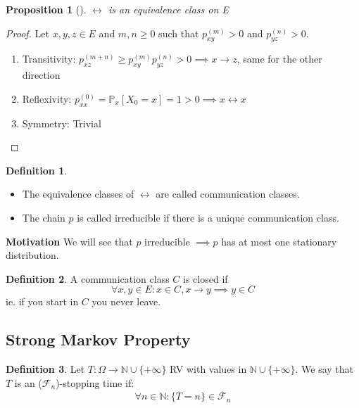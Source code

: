 \documentclass[12pt]{book}
\newtheorem{prop}[theorem]{Proposition}
\theoremstyle{definition}
\newtheorem{defn}{Definition}[section]
\theoremstyle{remark}
\begin{document}
\begin{prop}[]
	$\leftrightarrow$ is an equivalence class on E
\end{prop}
\begin{proof}
	Let $x,y,z \in E$ and $m,n \geq 0$ such that $p_{xy}^{(m)}>0$ and $p_{yz}^{(n)}>0$.
\begin{enumerate}
	\item Transitivity: $p_{xz}^{(m+n)} \geq p_{xy}^{(m)}p_{yz}^{(n)} >0 \implies x\rightarrow z$, same for the other direction 
	\item Reflexivity: $p_{xx}^{(0)} = \mathbb{P}_{x} \left[ X_0 = x \right] =1>0 \implies x \leftrightarrow x$ 
	\item Symmetry: Trivial
\end{enumerate}
\end{proof}


\begin{defn} \hfill
\begin{itemize}
\item The equivalence classes of $\leftrightarrow$ are called communication classes.
\item The chain $p$ is called irreducible if there is a unique communication class.
\end{itemize}
\end{defn}

\noindent
\textbf{Motivation} We will see that $p$ irreducible $\implies p$ has at most one stationary distribution.

\begin{defn}
	A communication class $C$ is closed if 
\begin{equation}
\forall x,y \in E: x \in C, x \to y \implies y \in C
\end{equation}
ie. if you start in $C$ you never leave.
\end{defn}

\subsection{Strong Markov Property}
	
\begin{defn}
	Let $T:\Omega \to \mathbb{N} \cup \{+\infty\}$ RV with values in $\mathbb{N}\cup\{+\infty\}$. We say that $T$ is an ($ \mathcal{F}_n$)-stopping time if:
	\begin{align}
		\forall n \in \mathbb{N}: \{T=n\} \in \mathcal{F}_n
	\end{align}
	
\end{defn}
\end{document}
